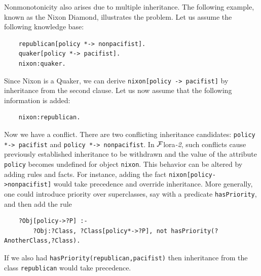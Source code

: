 \documentclass[11pt]{article}
\newcommand{\FLORA}{{\mbox{\sc ${\cal F}${lora}\rm\emph{-2}}}\xspace}
\begin{document}
Nonmonotonicity also arises due to multiple inheritance. The following
example, known as the Nixon Diamond, illustrates the problem. Let us assume
the following knowledge base:
\begin{verbatim}
    republican[policy *-> nonpacifist].
    quaker[policy *-> pacifist].
    nixon:quaker.
\end{verbatim}
Since Nixon is a Quaker, we can derive {\tt nixon[policy -> pacifist]}
by inheritance from the second clause. Let us now assume that the following
information is added:
\begin{verbatim}
    nixon:republican.  
\end{verbatim}
Now we have a conflict. There are two conflicting inheritance candidates:
{\tt policy *-> pacifist} and {\tt policy *-> nonpacifist}.    
In \FLORA, such conflicts cause previously established inheritance
to be withdrawn and the value of the attribute {\tt policy} becomes
undefined for object {\tt nixon}.
This behavior can be altered by adding rules and facts. For instance,
adding the fact {\tt nixon[policy->nonpacifist]} would take precedence and override
inheritance. More generally, one could introduce priority over superclasses, say with  
  a predicate {\tt hasPriority}, and then add the rule
\begin{verbatim}
    ?Obj[policy->?P] :-
        ?Obj:?Class, ?Class[policy*->?P], not hasPriority(?AnotherClass,?Class).
\end{verbatim}
If we also had {\tt hasPriority(republican,pacifist)} then inheritance from
the class {\tt republican} would take precedence. 
\end{document}
